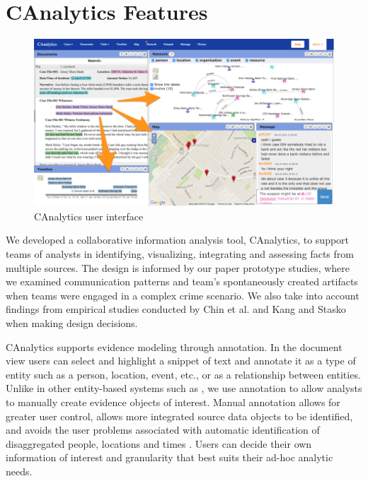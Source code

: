 \section{CAnalytics Features}\label{canalytics-features}

\begin{figure}
\centering
\includegraphics{./img/interface.png}
\caption{CAnalytics user interface}
\end{figure}

We developed a collaborative information analysis tool, CAnalytics, to
support teams of analysts in identifying, visualizing, integrating and
assessing facts from multiple sources. The design is informed by our
paper prototype studies, where we examined communication patterns and
team's spontaneously created artifacts when teams were engaged in a
complex crime scenario. We also take into account findings from
empirical studies conducted by Chin et al. \autocite{Chin2009} and Kang
and Stasko \autocite{Kang2011} when making design decisions.

CAnalytics supports evidence modeling through annotation. In the
document view users can select and highlight a snippet of text and
annotate it as a type of entity such as a person, location, event, etc.,
or as a relationship between entities. Unlike in other entity-based
systems such as \autocites{Bier2010}{Stasko2008}, we use annotation to
allow analysts to manually create evidence objects of interest. Manual
annotation allows for greater user control, allows more integrated
source data objects to be identified, and avoids the user problems
associated with automatic identification of disaggregated people,
locations and times \autocite{Bier2008}. Users can decide their own
information of interest and granularity that best suits their ad-hoc
analytic needs.

